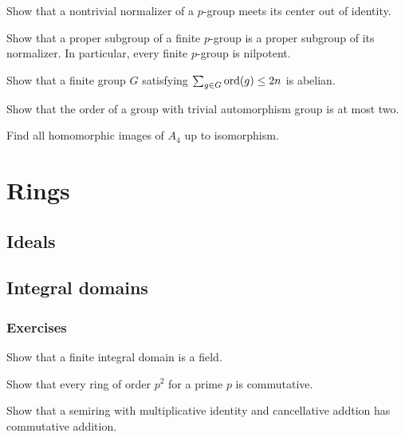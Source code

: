 \documentclass{../note}
\begin{document}
\begin{prb}
Show that a nontrivial normalizer of a $p$-group meets its center out of identity.
\end{prb}

\begin{prb}
Show that a proper subgroup of a finite $p$-group is a proper subgroup of its normalizer. In particular, every finite $p$-group is nilpotent.
\end{prb}

\begin{prb}
Show that a finite group $G$ satisfying $\sum_{g\in G}\operatorname{ord}(g)\le2n$ is abelian.
\end{prb}

\begin{prb}
Show that the order of a group with trivial automorphism group is at most two.
\end{prb}

\begin{prb}
Find all homomorphic images of $A_4$ up to isomorphism.
\end{prb}









\part{Rings}
\chapter{Ideals}


\chapter{Integral domains}

\section*{Exercises}
\begin{prb}
Show that a finite integral domain is a field.
\end{prb}

\begin{prb}
Show that every ring of order $p^2$ for a prime $p$ is commutative.
\end{prb}

\begin{prb}
Show that a semiring with multiplicative identity and cancellative addtion has commutative addition.
\end{prb}
\end{document}
